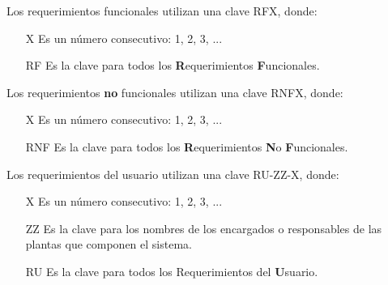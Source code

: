 Los requerimientos funcionales utilizan una clave RFX, donde:
\begin{itemize}
	\item[X] Es un número consecutivo: 1, 2, 3, ...
	\item[RF] Es la clave para todos los {\bf R}equerimientos {\bf F}uncionales.\\
\end{itemize}

    Los requerimientos {\bf no} funcionales utilizan una clave RNFX, donde:
\begin{itemize}
	\item[X] Es un número consecutivo: 1, 2, 3, ...
	\item[RNF] Es la clave para todos los {\bf R}equerimientos {\bf N}o {\bf F}uncionales.\\
\end{itemize}

	Los requerimientos del usuario utilizan una clave RU-ZZ-X, donde:
	
\begin{itemize}
	\item[X] Es un número consecutivo: 1, 2, 3, ...
	\item[ZZ] Es la clave para los nombres de los encargados o responsables de las plantas que componen el sistema.
	\item[RU] Es la clave para todos los {\bf } Requerimientos del {\bf U}suario.\\
\end{itemize}